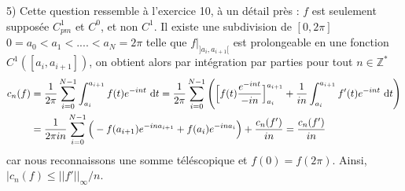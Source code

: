 \documentclass[12pt,a4paper]{article}
\newcommand{\Z}{\mathbb{Z}}
\newcounter{exercice}
\begin{document}
5) Cette question ressemble \`a l'exercice 10, \`a un d\'etail pr\`es : $f$
est seulement suppos\'ee $C^1_{pm}$ et $C^0$, et non $C^1$.
Il existe une subdivision de $[0,2\pi]$ $0=a_{0}<a_{1}<....<a_{N}=2\pi$ telle que $f\big|_{]a_{i},a_{i+1}[}$ est prolongeable en une fonction $C^1([a_{i},a_{i+1}])$, on obtient alors par int\'egration par parties pour tout $n\in \Z^*$
\begin{align*}
 c_{n}(f)&=\frac1{2\pi}\sum_{i=0}^{N-1} \int_{a_{i}}^{a_{i+1}}f(t)e^{-int} {\rm d}t=\frac1{2\pi}\sum_{i=0}^{N-1} \Bigg(\Big[ f(t)\frac{e^{-int}}{-in}  \Big]_{a_{i}}^{a_{i+1}}+\frac1{in}\int_{a_{i}}^{a_{i+1}}f'(t)e^{-int} {\rm d}t \Bigg)\\
 &=\frac1{2\pi i n}\sum_{i=0}^{N-1} \Big(  -f(a_{i+1})e^{-ina_{i+1}}+f(a_{i})e^{-ina_{i}}  \Big) + \frac{c_{n}(f')}{in}=\frac{c_{n}(f')}{in}
\end{align*}
car nous reconnaissons une somme t\'el\'escopique et $f(0)=f(2\pi)$.
Ainsi, $|c_{n}(f) \le ||f'||_\infty/n$.
\end{document}
